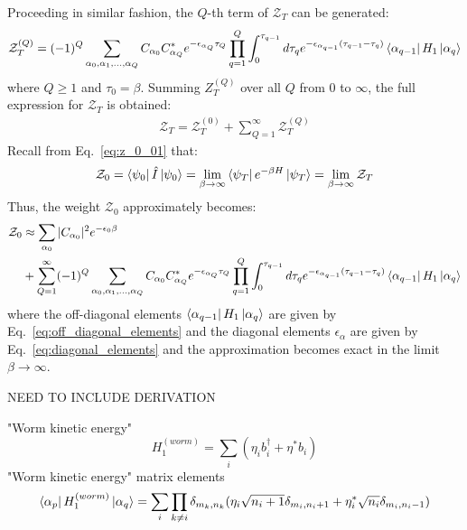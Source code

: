 \documentclass[12pt, two sided]{article}
\begin{document}
Proceeding in similar fashion, the $Q$-th term of $\mathcal{Z}_T$ can be generated:
\begin{equation}
\label{eq:Z^q}
\mathcal{Z}_T^{(Q)} = (-1)^{Q}  \sum_{\alpha_0,\alpha_1,\dots,\alpha_Q} C_{\alpha_0} C_{\alpha_Q}^* e^{-\epsilon_{\alpha_Q} \tau_Q} \prod_{q=1}^Q \int_0^{\tau_{q-1}} d\tau_q e^{-\epsilon_{\alpha_{q-1}}(\tau_{q-1}-\tau_q)} 
\bra{\alpha_{q-1}} H_1 \ket{\alpha_q}
\end{equation}
where $Q \geq 1$ and $\tau_0 = \beta$. Summing $Z_T^{(Q)}$ over all $Q$ from $0$ to $\infty$, the full expression for $\mathcal{Z}_T$ is obtained:
%
\begin{equation}
\begin{aligned}
\mathcal{Z}_T = \mathcal{Z}_T^{(0)} + \sum_{Q=1}^{\infty} \mathcal{Z}_T^{(Q)}
\end{aligned}
\end{equation}
%
Recall from Eq.~\eqref{eq:z_0_01} that:
%
\begin{equation}
\mathcal{Z}_0 = \bra{\psi_0} \hat{I} \ket{\psi_0} = \lim_{\beta\to\infty} \bra{\psi_T} e^{-\beta H} \ket{\psi_T} = \lim_{\beta\to\infty} \mathcal{Z}_T
\end{equation}
%
Thus, the weight $\mathcal{Z}_0$ approximately becomes:
\begin{equation}
\begin{aligned}
\label{eq:Z_0}
\mathcal{Z}_0 &\approx \sum_{\alpha_0} \vert C_{\alpha_0} \vert^2 e^{-\epsilon_{0} \beta} \\ &+ 
\sum_{Q=1}^{\infty} (-1)^{Q}  \sum_{\alpha_0,\alpha_1,\dots,\alpha_Q} C_{\alpha_0} C_{\alpha_Q}^* e^{-\epsilon_{\alpha_Q} \tau_Q} \prod_{q=1}^Q \int_0^{\tau_{q-1}} d\tau_q e^{-\epsilon_{\alpha_{q-1}}(\tau_{q-1}-\tau_q)} 
\bra{\alpha_{q-1}} H_1 \ket{\alpha_q}
\end{aligned}
\end{equation}
where the off-diagonal elements $\bra{\alpha_{q-1}} H_1 \ket{\alpha_q}$ are given by Eq.~\eqref{eq:off_diagonal_elements} and the diagonal elements $\epsilon_{\alpha}$ are given by Eq.~\eqref{eq:diagonal_elements} and the approximation becomes exact in the limit $\beta\to\infty$.

NEED TO INCLUDE DERIVATION 


"Worm kinetic energy"
%
\begin{equation}
H_1^{(worm)} = \sum_i (\eta_i b_i^\dag + \eta^* b_i)
\end{equation}
%
"Worm kinetic energy" matrix elements
%
\begin{equation}
\bra{\alpha_p} H_1^{(worm)} \ket{\alpha_q} =  \sum_i  \prod_{k\neq i} \delta_{m_k,n_k} (\eta_i \sqrt{n_i + 1} \delta_{m_i,n_{i}+1}  + \eta_i^* \sqrt{n_i} \delta_{m_i,n_{i}-1})
\end{equation}
%
\end{document}
